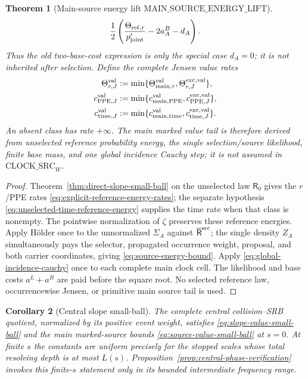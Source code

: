 \documentclass[11pt]{article}
\newtheorem{theorem}{Theorem}[section]
\newtheorem{corollary}[theorem]{Corollary}
\begin{document}
\begin{theorem}[Main-source energy lift
$\mathrm{MAIN\_SOURCE\_ENERGY\_LIFT}$]
\begin{equation}
\label{eq:normalized-selection-rate-special-case}
 \frac12\left(\frac{\Theta_{{\rm ref},r}}{p_{\rm joint}'}
                 -2a_A^{B}-d_A\right).
\end{equation}
Thus the old two-base-cost expression is only the special case $d_A=0$;
it is not inherited after selection.  Define the complete Jensen value rates
\begin{equation}
\label{eq:complete-Jensen-value-rates}
\begin{aligned}
 \Theta_{r,J}^{\rm val}&:=\min\{
   \Theta_{{\rm main},r}^{\rm val},
   \Theta_{r,J}^{\rm exc,val}\},\\
 c_{{\rm PPE},J}^{\rm val}&:=\min\{
   c_{{\rm main},{\rm PPE}}^{\rm val},
   c_{{\rm PPE},J}^{\rm exc,val}\},\\
 c_{{\rm time},J}^{\rm val}&:=\min\{
   c_{{\rm main},{\rm time}}^{\rm val},
   c_{{\rm time},J}^{\rm exc,val}\}.
\end{aligned}
\end{equation}
An absent class has rate $+\infty$.  The main marked value tail is therefore
derived from unselected reference probability energy, the single
selection/source likelihood, finite base mass, and one global incidence
Cauchy step; it is not
assumed in
$\mathrm{CLOCK\_SRC}_{W}$.
\end{theorem}

\begin{proof}
Theorem~\ref{thm:direct-slope-small-ball} on the unselected law
$\mathsf R_0$ gives the $r$/PPE rates
\eqref{eq:explicit-reference-energy-rates}; the separate hypothesis
\eqref{eq:unselected-time-reference-energy} supplies the time rate when that
class is nonempty.  The pointwise normalization of $\zeta$ preserves these reference
energies.  Apply H\"older once to the unnormalized $\Sigma_A$ against
$\overline{\mathsf R}^{\rm src}$; the single density $Z_A$ simultaneously pays the
selector, propagated occurrence weight, proposal, and both carrier
coordinates, giving \eqref{eq:source-energy-bound}.  Apply
\eqref{eq:global-incidence-cauchy} once to each complete main clock cell.
The likelihood and base costs $a^L+a^B$ are paid before the square root.  No
selected reference law, occurrencewise Jensen, or primitive main source tail
is used.
\end{proof}

\begin{corollary}[Central slope small-ball]
\label{cor:central-g2}
The complete central collision--SRB quotient, normalized by its positive
event weight, satisfies
\eqref{eq:slope-value-small-ball} and the main marked-source bounds
\eqref{eq:source-value-small-ball} at $s=0$.  At finite $s$ the constants are
uniform precisely for the stopped scales whose total resolving depth is at
most $L(s)$.  Proposition~\ref{prop:central-phase-verification} invokes this
finite-$s$ statement only in its bounded intermediate frequency range.
\end{corollary}
\end{document}
